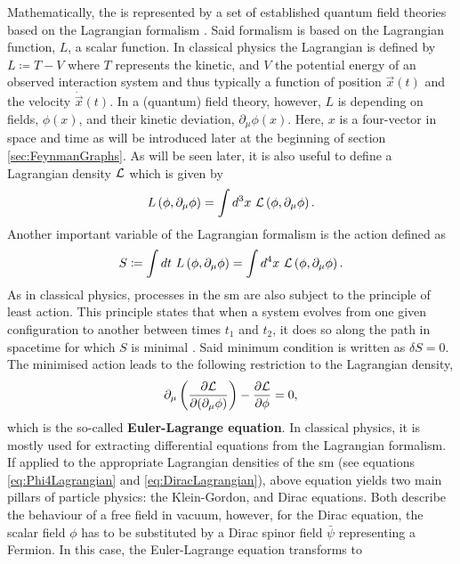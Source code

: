 Mathematically, the  is represented by a set of established quantum field theories based on the Lagrangian formalism \cite{IntroductionQFT, StandardModel, PhysicsFromSymmetry}. Said formalism is based on the Lagrangian function, $L$, a scalar function. In classical physics the Lagrangian is defined by $L \coloneqq T - V$ where $T$ represents the kinetic, and $V$ the potential energy of an observed interaction system and thus typically a function of position $\vec{x}(t)$ and the velocity $\dot{\vec{x}}(t)$. In a (quantum) field theory, however, $L$ is depending on fields, $\phi(x)$, and their kinetic deviation, $\partial_{\mu}\phi(x)$. Here, $x$ is a four-vector in space and time as will be introduced later at the beginning of section \ref{sec:FeynmanGraphs}. As will be seen later, it is also useful to define a Lagrangian density $\mathcal{L}$ which is given by
\begin{equation}
    L\left(\phi,\partial_{\mu}\phi\right) = \int d^3x \ \mathcal{L}\left(\phi,\partial_{\mu}\phi\right).
\end{equation}
Another important variable of the Lagrangian formalism is the action defined as
\begin{equation}
    S \coloneqq \int dt \ L\left(\phi,\partial_{\mu}\phi\right) = \int d^4x \ \Lagr\left(\phi,\partial_{\mu}\phi\right).
\end{equation}
As in classical physics, processes in the \gls{sm} are also subject to the principle of least action. This principle states that when a system evolves from one given configuration to another between times $t_1$ and $t_2$, it does so along the path in spacetime for which $S$ is minimal \cite{IntroductionQFT}. Said minimum condition is written as $\delta S = 0$. The minimised action leads to the following restriction to the Lagrangian density,
\begin{equation} \label{eq:EulerLagrange}
    \partial_{\mu}\left( \frac{\partial \mathcal{L}}{\partial (\partial_{\mu}\phi)} \right) - \frac{\partial \mathcal{L}}{\partial \phi} = 0,
\end{equation}
which is the so-called \textbf{Euler-Lagrange equation}. In classical physics, it is mostly used for extracting differential equations from the Lagrangian formalism. If applied to the appropriate Lagrangian densities of the \gls{sm} (see equations \ref{eq:Phi4Lagrangian} and \ref{eq:DiracLagrangian}), above equation yields two main pillars of particle physics: the Klein-Gordon, and Dirac equations. Both describe the behaviour of a free field in vacuum, however, for the Dirac equation, the scalar field $\phi$ has to be substituted by a Dirac spinor field $\bar{\psi}$ representing a \gls{Fermion}. In this case, the Euler-Lagrange equation transforms to \cite{Griffiths,ModernParticlePhysics}
